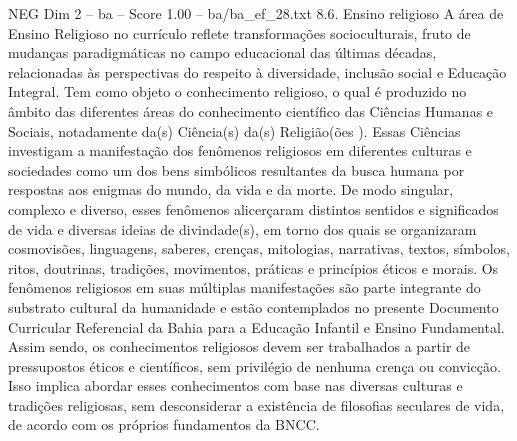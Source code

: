 \begin{textsample}{NEG Dim 2 – ba – Score 1.00 – ba/ba\_ef\_28.txt}  \label{ex:f2_neg_257}
8.6.
Ensino religioso A área de Ensino Religioso no currículo reflete transformações socioculturais, fruto de mudanças paradigmáticas no campo educacional das últimas décadas, relacionadas às perspectivas do respeito à diversidade, inclusão social e Educação Integral.
Tem como objeto o conhecimento religioso, o qual é produzido no âmbito das diferentes áreas do conhecimento científico das Ciências Humanas e Sociais, notadamente da(s) Ciência(s) da(s) Religião(ões ).
Essas Ciências investigam a manifestação dos fenômenos religiosos em diferentes culturas e sociedades como um dos bens simbólicos resultantes da busca humana por respostas aos enigmas do mundo, da vida e da morte.
De modo singular, complexo e diverso, esses fenômenos alicerçaram distintos sentidos e significados de vida e diversas ideias de divindade(s), em torno dos quais se organizaram cosmovisões, linguagens, saberes, crenças, mitologias, narrativas, textos, símbolos, ritos, doutrinas, tradições, movimentos, práticas e princípios éticos e morais.
Os fenômenos religiosos em suas múltiplas manifestações são parte integrante do substrato cultural da humanidade e estão contemplados no presente Documento Curricular Referencial da Bahia para a Educação Infantil e Ensino Fundamental.
Assim sendo, os conhecimentos religiosos devem ser trabalhados a partir de pressupostos éticos e científicos, sem privilégio de nenhuma crença ou convicção.
Isso implica abordar esses conhecimentos com base nas diversas culturas e tradições religiosas, sem desconsiderar a existência de filosofias seculares de vida, de acordo com os próprios fundamentos da BNCC.

\end{textsample}
